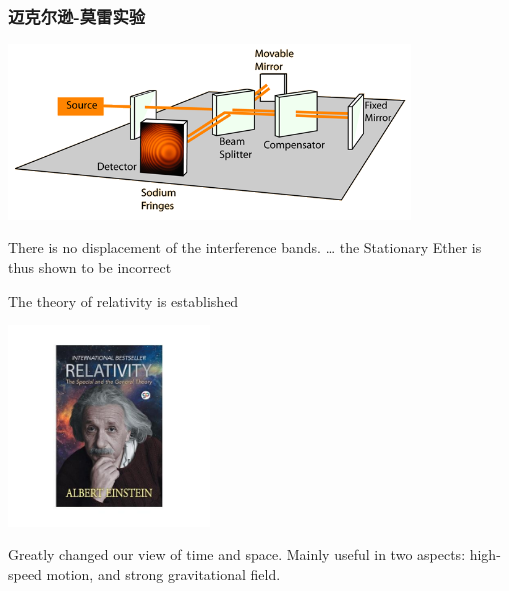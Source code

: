 \begin{frame}
    \frametitle{迈克尔逊-莫雷实验}
    \begin{center}
    \includegraphics[width=0.8\textwidth]{figs/michel.png}
    \end{center}
There is no displacement of the interference bands. \dots 
the Stationary Ether is thus shown to be incorrect
\end{frame}

\begin{frame}
    The theory of relativity is established 
    \begin{center}
        \includegraphics[width=0.4\textwidth]{figs/relativity.jpg}
    \end{center}   
    Greatly changed our view of time and space. Mainly useful in two aspects: high-speed motion, and strong gravitational field. 
\end{frame}

